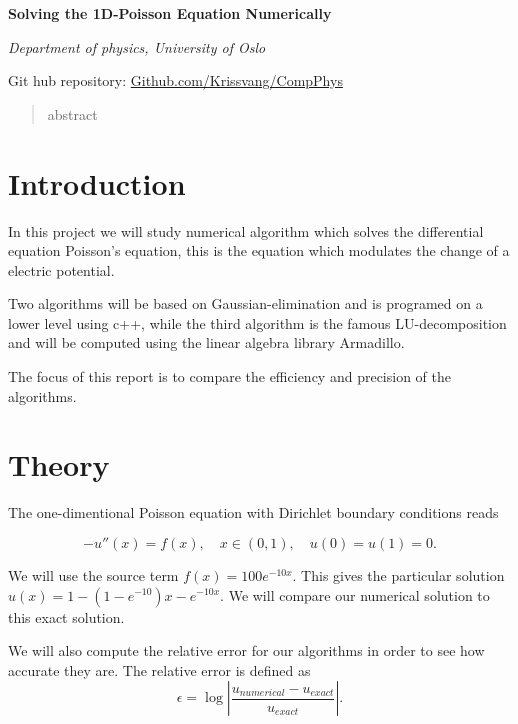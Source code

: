 \documentclass[10pt]{article}
\begin{document}
\begin{center}
  \large \textbf{Solving the 1D-Poisson Equation Numerically}

  
  \textit{Department of physics, University of Oslo}



  Git hub repository: \href{https://github.com/Krissvang/CompPhys}{Github.com/Krissvang/CompPhys}
\end{center}
\begin{abstract}
  abstract 


\end{abstract}
\section{Introduction}
In this project we will study numerical algorithm which solves the differential equation Poisson's equation, this is the equation which modulates the change of a electric potential. 

Two algorithms will be based on Gaussian-elimination and is programed on a lower level using c++, while the third algorithm is the famous LU-decomposition and will be computed using the linear algebra library Armadillo.

The focus of this report is to compare the efficiency and precision of the algorithms.

\section{Theory}
The one-dimentional Poisson equation 
with Dirichlet boundary conditions reads 

\begin{equation*}
 -u''(x)=f(x),\quad x\in (0,1),\quad u(0)=u(1)=0.
\end{equation*}

We will use the source term $f(x)=100e^{-10x}$. This gives the particular solution 
$u(x)=1-(1-e^{-10})x-e^{-10x}$. We will compare our numerical solution to this exact solution.

We will also compute the relative error for our algorithms in order to see how accurate they are. The relative error is defined as 
$$ \epsilon=\log{\left|\frac{u_{numerical}-u_{exact}}{u_{exact}}\right|}.$$
\end{document}
